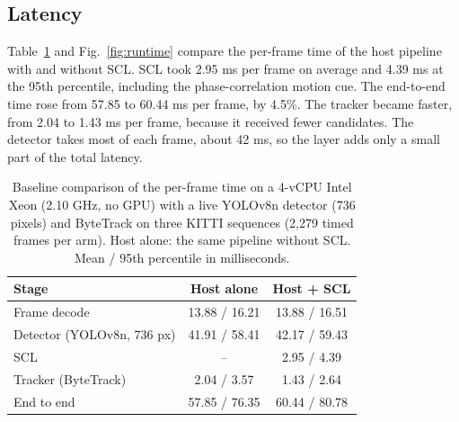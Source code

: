 \documentclass[pdflatex,sn-mathphys-num,iicol]{sn-jnl}
\newcommand{\scl}{SCL}
\begin{document}
\subsection{Latency}\label{sec:latency}
Table~\ref{tab:runtime} and Fig.~\ref{fig:runtime} compare the per-frame time
of the host pipeline with and without \scl{}. \scl{} took 2.95 ms per
frame on average and 4.39 ms at the 95th percentile, including the
phase-correlation motion cue. The end-to-end time rose from 57.85 to 60.44 ms
per frame, by 4.5\%. The tracker became faster, from 2.04 to 1.43 ms per
frame, because it received fewer candidates. The detector takes most of each
frame, about 42 ms, so the layer adds only a small part of the total latency.

\begin{table}[t]
\caption{Baseline comparison of the per-frame time on a 4-vCPU Intel Xeon
(2.10 GHz, no GPU) with a live YOLOv8n detector (736 pixels) and ByteTrack on
three KITTI sequences (2,279 timed frames per arm). Host alone: the same
pipeline without \scl{}. Mean / 95th percentile in milliseconds.}
\label{tab:runtime}
\centering\footnotesize
\setlength{\tabcolsep}{4pt}
\begin{tabular}{@{}lcc@{}}
\toprule
Stage & Host alone & Host + \scl{}\\
\midrule
Frame decode & 13.88 / 16.21 & 13.88 / 16.51\\
Detector (YOLOv8n, 736 px) & 41.91 / 58.41 & 42.17 / 59.43\\
\scl{} & -- & 2.95 / 4.39\\
Tracker (ByteTrack) & 2.04 / 3.57 & 1.43 / 2.64\\
End to end & 57.85 / 76.35 & 60.44 / 80.78\\
\bottomrule
\end{tabular}
\end{table}
\end{document}
